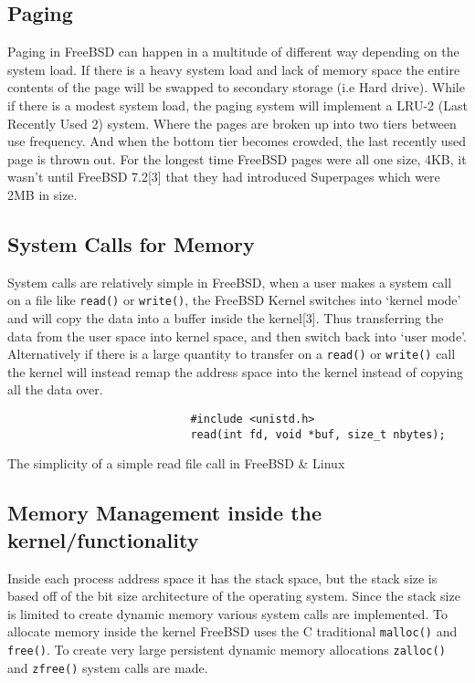\documentclass{article}
\begin{document}
\subsection{Paging}
    Paging in FreeBSD can happen in a multitude of different way depending on the system load. If there is a heavy system load and lack of memory space the entire contents of the page will be swapped to secondary storage (i.e Hard drive). While if there is a modest system load, the paging system will implement a LRU-2 (Last Recently Used 2) system. Where the pages are broken up into two tiers between use frequency. And when the bottom tier becomes crowded, the last recently used page is thrown out. For the longest time FreeBSD pages were all one size, 4KB, it wasn’t until FreeBSD 7.2[3] that they had introduced Superpages which were 2MB in size.
\subsection{System Calls for Memory}
    System calls are relatively simple in FreeBSD, when a user makes a system call on a file like \texttt{read()} or \texttt{write()}, the FreeBSD Kernel switches into ‘kernel mode’ and will copy the data into a buffer inside the kernel[3]. Thus transferring the data from the user space into kernel space, and then switch back into ‘user mode’. Alternatively if there is a large quantity to transfer on a \texttt{read()} or \texttt{write()} call the kernel will instead remap the address space into the kernel instead of copying all the data over. \newline
                            \begin{lstlisting}
                            #include <unistd.h>
                            read(int fd, void *buf, size_t nbytes);
                            \end{lstlisting}
                            The simplicity of a simple read file call in FreeBSD \& Linux
\subsection{Memory Management inside the kernel/functionality}
    Inside each process address space it has the stack space, but the stack size is based off of the bit size architecture of the operating system. Since the stack size is limited to create dynamic memory various system calls are implemented. To allocate memory inside the kernel FreeBSD uses the C traditional \texttt{malloc()} and \texttt{free()}. To create very large persistent dynamic memory allocations \texttt{zalloc()} and \texttt{zfree()} system calls are made.
\end{document}

